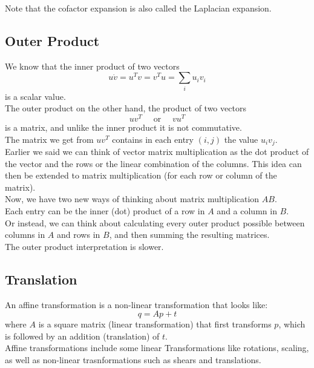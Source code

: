 \documentclass[12pt]{article}
\begin{document}
Note that the cofactor expansion is also
called the Laplacian expansion. \\

\newpage

\subsection*{Outer Product}

We know that the inner product of two vectors 
\[ u \dot v = u^Tv = v^Tu = \sum_i u_iv_i \]
is a scalar value. \\

The outer product on the other hand,
the product of two vectors
\[ uv^T \quad \text{ or } \quad vu^T \]
is a matrix, and unlike the inner product
it is not commutative. \\
The matrix we get from $uv^T$
contains in each entry $(i, j)$
the value $u_iv_j$. \\

Earlier we said we can think of vector matrix
multiplication as the dot product
of the vector and the rows or the linear combination
of the columns.
This idea can then be extended to
matrix multiplication (for each row or column
of the matrix). \\

Now, we have two new ways of thinking about matrix
multiplication $AB$. \\
Each entry can be the inner (dot) product of
a row in $A$ and a column in $B$. \\
Or instead, we can think about
calculating every outer product possible
between columns in $A$ and rows in $B$,
and then summing the resulting matrices. \\
The outer product interpretation is slower. \\

\newpage

\subsection*{Translation}

An affine transformation is a non-linear
transformation that looks like:
\[ q = Ap + t \]
where $A$ is a square matrix
(linear transformation) that first transforms $p$,
which is followed by an addition (translation) of $t$. \\
Affine transformations include
some linear Transformations
like rotations, scaling, as well as non-linear
trasnformations such as shears and translations. \\
\end{document}
